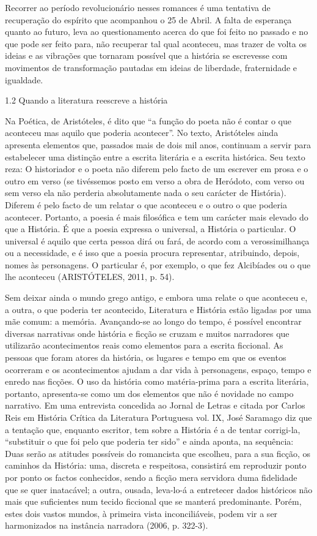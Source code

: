 \documentclass[../DISSERTACAO_MAIN.tex]{subfiles}
\begin{document}
Recorrer ao período revolucionário nesses romances é uma tentativa de recuperação do espírito que acompanhou o 25 de Abril. A falta de esperança quanto ao futuro, leva ao questionamento acerca do que foi feito no passado e no que pode ser feito para, não recuperar tal qual aconteceu, mas trazer de volta os ideias e as vibrações que tornaram possível que a história se escrevesse com movimentos de transformação pautadas em ideias de liberdade, fraternidade e igualdade. 


1.2 Quando a literatura reescreve a história


Na Poética, de Aristóteles, é dito que “a função do poeta não é contar o que aconteceu mas aquilo que poderia acontecer”. No texto, Aristóteles ainda apresenta elementos que, passados mais de dois mil anos, continuam a servir para estabelecer uma distinção entre a escrita literária e a escrita histórica. Seu texto reza:
O historiador e o poeta não diferem pelo facto de um escrever em prosa e o outro em verso (se tivéssemos posto em verso a obra de Heródoto, com verso ou sem verso ela não perderia absolutamente nada o seu carácter de História). Diferem é pelo facto de um relatar o que aconteceu e o outro o que poderia acontecer. Portanto, a poesia é mais filosófica e tem um carácter mais elevado do que a História. É que a poesia expressa o universal, a História o particular. O universal é aquilo que certa pessoa dirá ou fará, de acordo com a verossimilhança ou a necessidade, e é isso que a poesia procura representar, atribuindo, depois, nomes às personagens. O particular é, por exemplo, o que fez Alcibíades ou o que lhe aconteceu (ARISTÓTELES, 2011, p. 54).  

Sem deixar ainda o mundo grego antigo, e embora uma relate o que aconteceu e, a outra, o que poderia ter acontecido, Literatura e História estão ligadas por uma mãe comum: a memória. Avançando-se ao longo do tempo, é possível encontrar diversas narrativas onde história e ficção se cruzam e muitos narradores que utilizarão acontecimentos reais como elementos para a escrita ficcional. As pessoas que foram atores da história, os lugares e tempo em que os eventos ocorreram e os acontecimentos ajudam a dar vida à personagens, espaço, tempo e enredo nas ficções.
O uso da história como matéria-prima para a escrita literária, portanto, apresenta-se como um dos elementos que não é novidade no campo narrativo. Em uma entrevista concedida ao Jornal de Letras e citada por Carlos Reis em História Crítica da Literatura Portuguesa vol. IX, José Saramago diz que a tentação que, enquanto escritor, tem sobre a História é a de tentar corrigi-la, “substituir o que foi pelo que poderia ter sido” e ainda aponta, na sequência:
Duas serão as atitudes possíveis do romancista que escolheu, para a sua ficção, os caminhos da História: uma, discreta e respeitosa, consistirá em reproduzir ponto por ponto os factos conhecidos, sendo a ficção mera servidora duma fidelidade que se quer inatacável; a outra, ousada, leva-lo-á a entretecer dados históricos não mais que suficientes num tecido ficcional que se manterá predominante. Porém, estes dois vastos mundos, à primeira vista inconciliáveis, podem vir a ser harmonizados na instância narradora (2006, p. 322-3).
\end{document}
